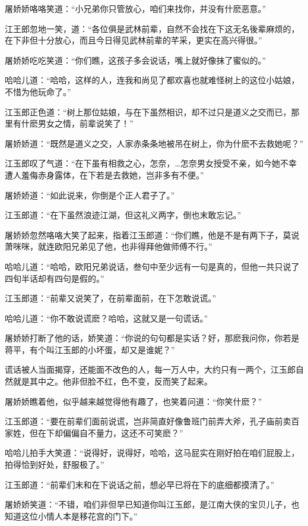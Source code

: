 \documentclass[12pt,oneside]{book}
\begin{document}
屠娇娇咯咯笑道：``小兄弟你只管放心，咱们来找你，并没有什麽恶意。''

江王郎忽地一笑，道：``各位俱是武林前辈，自然不会找在下这无名後辈麻烦的，在下非但十分放心，而且今日得见武林前辈的芊采，更实在高兴得很。''

屠娇娇吃吃笑道：``你们瞧，这孩子多会说话，嘴上就好像抹了蜜似的。''

哈哈儿道：``哈哈，这样的人，连我和尚见了都欢喜也就难怪树上的这位小姑娘，不惜为他玩命了。''

江玉郎正色道：``树上那位姑娘，与在下虽然相识，却不过只是道义之交而已，那里有什麽男女之情，前辈说笑了！''

屠娇娇道：``既然是道义之交，人家赤条条地被吊在树上，你为什麽不去救她呢？''

江玉郎叹了气道：``在下虽有相救之心，怎奈，\ldots 怎奈男女授受不亲，如今她不幸遭人羞侮赤身露体，在下若是去救她，岂非多有不便。''

屠娇娇道：``如此说来，你倒是个正人君子了。''

江玉郎道：``在下虽然浪迹江湖，但这礼义两字，倒也末敢忘记。''

屠娇娇忽然咯咯大笑了起来，指着江玉郎道：``你们瞧，他是不是有两下子，莫说萧咪咪，就连欧阳兄弟见了他，也非得拜他做师傅不行。''

哈哈儿道：``哈哈，欧阳兄弟说话，叁句中至少远有一句是真的，但他一共只说了四旬半话却有四句是假的。''

江玉郎道：``前辈又说笑了，在前辈面前，在下怎敢说谎。''

哈哈儿道：``你不敢说谎麽？哈哈，这就又是一句谎话。''

屠娇娇打断了他的话，娇笑道：``你说的句句都是实话？好，那麽我问你，你若是蒋平，有个叫江玉郎的小坏蛋，却又是谁妮？''

谎话被人当面揭穿，还能面不改色的人，每一万人中，大约只有一两个，江玉郎自然就是其中之。他非但脸不红，色不变，反而笑了起来。

屠娇娇瞧着他，似乎越来越觉得他有趣了，也笑着问道：``你笑什麽？''

江玉郎道：``要在前辈们面前说谎，岂非简直好像鲁班门前弄大斧，孔子庙前卖百家姓，但在下却偏偏自不量力，这还不可笑麽？''

哈哈儿拍手大笑道：``说得好，说得好，哈哈，这马屁实在刚好拍在咱们屁股上，拍得恰到好处，舒服极了。''

江玉郎道：``前辈们末和在下说话之前，想必早已将在下的底细都摸清了。''

屠娇娇笑道：``不错，咱们非但早已知道你叫江玉郎，是江南大侠的宝贝儿子，也知道这位小情人本是移花宫的门下。''
\end{document}

